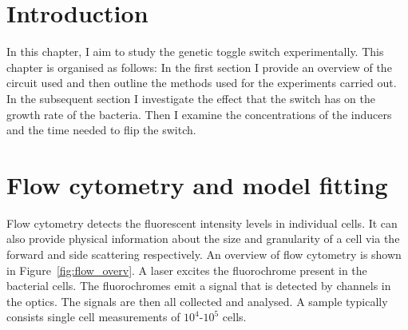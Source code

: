 \section{Introduction}
In this chapter, I aim to study the genetic toggle switch experimentally.  This chapter is organised as follows: In the first section I provide an overview of the circuit used and then outline the methods used for the experiments carried out. In the subsequent section I investigate the effect that the switch has on the growth rate of the bacteria. Then I examine the concentrations of the inducers and the time needed to flip the switch. 


\section{Flow cytometry and model fitting}

Flow cytometry detects the fluorescent intensity levels in individual cells. It can also provide physical information about the size and granularity of a cell via the forward and side scattering respectively. An overview of flow cytometry is shown in Figure~\ref{fig:flow_overv}. A laser excites the fluorochrome present in the bacterial cells. The fluorochromes emit a signal that is detected by channels in the optics. The signals are then all collected and analysed. A sample typically consists single cell measurements of $10^4$-$10^5$ cells. %



